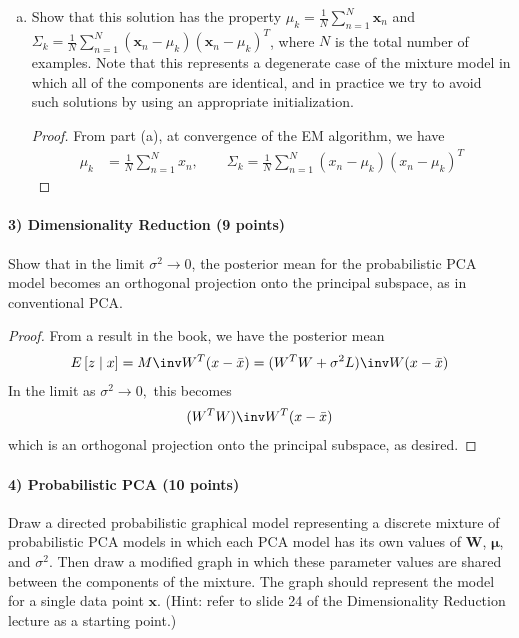 \documentclass{article}
\begin{document}
\begin{enumerate}[(a)]
	\item Show that this solution has the property $\mu_k=\frac{1}{N}\sum_{n=1}^{N}\mathbf{x}_n$ and $\Sigma_k=\frac{1}{N}\sum_{n=1}^{N}(\mathbf{x}_n-\mu_k)(\mathbf{x}_n-\mu_k)^T$, where $N$ is the total number of examples. Note that this represents a degenerate case of the mixture model in which all of the components are identical, and in practice we try to avoid such solutions by using an appropriate initialization.
		\begin{proof}
			From part (a), at convergence of the EM algorithm, we have
			\begin{align*}
				\mu_k &= \frac{1}{N}\sum_{n=1}^{N} x_n, \quad\quad \Sigma_k = \frac{1}{N} \sum_{n=1}^{N} \left( x_n-\mu_k \right)\left( x_n-\mu_k \right)^T
			\end{align*}
		\end{proof}

\end{enumerate}

\paragraph{3) Dimensionality Reduction (9 points)}

Show that in the limit $\sigma^2 \rightarrow 0$, the posterior mean for the probabilistic PCA model becomes an orthogonal projection onto the principal subspace, as in conventional PCA.
\begin{proof}
	From a result in the book, we have the posterior mean
	\begin{align*}
		E\left[ z\mid x \right] = M\inv W^T(x-\bar x) = (W^TW+\sigma^2L)\inv W(x-\bar x)
	\end{align*}
	In the limit as $\sigma^2\to 0,$ this becomes
	\begin{align*}
		(W^TW)\inv W^T(x-\bar x)
	\end{align*}
	which is an orthogonal projection onto the principal subspace, as desired.
\end{proof}


\paragraph{4) Probabilistic PCA (10 points)}

Draw a directed probabilistic graphical model representing a discrete mixture of probabilistic PCA models in which each PCA model has its own values of $\mathbf{W}$, $\boldsymbol{\mu}$, and $\sigma^2$. Then draw a modified graph in which these parameter values are shared between the components of the mixture. The graph should represent the model for a single data point $\mathbf{x}$. (Hint: refer to slide 24 of the Dimensionality Reduction lecture as a starting point.)
\end{document}
